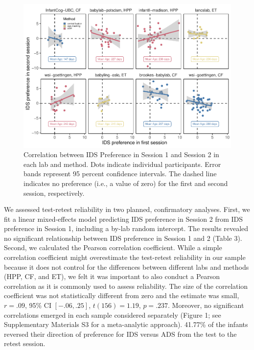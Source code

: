 \documentclass[
  english,
  man,floatsintext]{apa6}
\begin{document}
\begin{figure}

{\centering \includegraphics{Retest_current_draft_files/figure-latex/unnamed-chunk-5-1} 

}

\caption{Correlation between IDS Preference in Session 1 and Session 2 in each lab and method. Dots indicate individual participants. Error bands represent 95 percent confidence intervals. The dashed line indicates no preference (i.e., a value of zero) for the first and second session, respectively.}\label{fig:unnamed-chunk-5}
\end{figure}

We assessed test-retest reliability in two planned, confirmatory analyses.
First, we fit a linear mixed-effects model predicting IDS preference in Session 2 from IDS preference in Session 1, including a by-lab random intercept.
The results revealed no significant relationship between IDS preference in Session 1 and 2 (Table 3).
Second, we calculated the Pearson correlation coefficient.
While a simple correlation coefficient might overestimate the test-retest reliability in our sample because it does not control for the differences between different labs and methods (HPP, CF, and ET), we felt it was important to also conduct a Pearson correlation as it is commonly used to assess reliability.
The size of the correlation coefficient was not statistically different from zero and the estimate was small, \(r = .09\), 95\% CI \([-.06, .25]\), \(t(156) = 1.19\), \(p = .237\).
Moreover, no significant correlations emerged in each sample considered separately (Figure 1; see Supplementary Materials S3 for a meta-analytic approach).
41.77\% of the infants reversed their direction of preference for IDS versus ADS from the test to the retest session.
\end{document}
